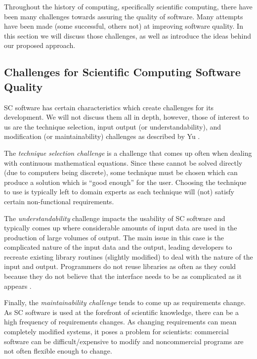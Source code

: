 \documentclass{sig-alternate-05-2015}
\begin{document}
Throughout the history of computing, specifically scientific computing, there
have been many challenges towards assuring the quality of software. Many
attempts have been made (some successful, others not) at improving software
quality. In this section we will discuss those challenges, as well as introduce
the ideas behind our proposed approach.

\subsection{Challenges for Scientific Computing Software
  Quality} \label{ssec:challenges}

SC software has certain characteristics which create challenges for its
development. We will not discuss them all in depth, however, those of interest
to us are the technique selection, input output (or understandability), and
modification (or maintainability) challenges as described by Yu \cite{Yu2011}.

The \textit{technique selection challenge} is a challenge that comes up often
when dealing with continuous mathematical equations. Since these cannot be
solved directly (due to computers being discrete), some technique must be chosen
which can produce a solution which is ``good enough'' for the user. Choosing the
technique to use is typically left to domain experts as each technique will
(not) satisfy certain non-functional
requirements. %

The \textit{understandability} challenge impacts the usability of SC software
and typically comes up where considerable amounts of input data are used in the
production of large volumes of output. The main issue in this case is the
complicated nature of the input data and the output, leading developers to
recreate existing library routines (slightly modified) to deal with the nature
of the input and output. Programmers do not reuse libraries as often as they
could because they do not believe that the interface needs to be as complicated
as it appears \cite{Dubois2002}.

Finally, the \textit{maintainability challenge} tends to come up as requirements
change. As SC software is used at the forefront of scientific knowledge, there
can be a high frequency of requirements changes. As changing requirements can
mean completely modified systems, it poses a problem for scientists: commercial
software can be difficult/expensive to modify and noncommercial programs are not
often flexible enough to change.
\end{document}
